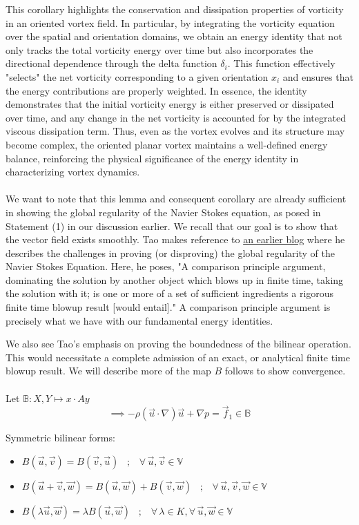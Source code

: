 \documentclass[12pt]{article}
\begin{document}
\begin{remark}
    This corollary highlights the conservation and dissipation properties of vorticity in an oriented vortex field. In particular, by integrating the vorticity equation over the spatial and orientation domains, we obtain an energy identity that not only tracks the total vorticity energy over time but also incorporates the directional dependence through the delta function \(\delta_i\). This function effectively "selects" the net vorticity corresponding to a given orientation \(x_i\) and ensures that the energy contributions are properly weighted. In essence, the identity demonstrates that the initial vorticity energy is either preserved or dissipated over time, and any change in the net vorticity is accounted for by the integrated viscous dissipation term. Thus, even as the vortex evolves and its structure may become complex, the oriented planar vortex maintains a well-defined energy balance, reinforcing the physical significance of the energy identity in characterizing vortex dynamics. \\ \\ 
    We want to note that this lemma and consequent corollary are already sufficient in showing the global regularity of the Navier Stokes equation, as posed in Statement (1) in our discussion earlier. We recall that our goal is to show that the vector field exists smoothly. Tao makes reference to \href{https://terrytao.wordpress.com/2007/03/18/why-global-regularity-for-navier-stokes-is-hard/}{an earlier blog} where he describes the challenges in proving (or disproving) the global regularity of the Navier Stokes Equation. Here, he poses, "A comparison principle argument, dominating the solution by another object which blows up in finite time, taking the solution with it; is one or more of a set of sufficient ingredients a rigorous finite time blowup result [would entail]." A comparison principle argument is precisely what we have with our fundamental energy identities. 
\end{remark} 

We also see Tao's emphasis on proving the boundedness of the bilinear operation. This would necessitate a complete admission of an exact, or analytical finite time blowup result. We will describe more of the map $B$ follows to show convergence. \\\\
 Let $\mathbb{B} : X,Y \mapsto x\cdot Ay$
\[\implies -\rho(\vec u \cdot \nabla) \vec u + \nabla p = \vec f_{1} \in \mathbb{B}\]

Symmetric bilinear forms: 
\begin{itemize}
    \item $B (\vec u, \vec v) = B (\vec v, \vec u) \;\;\;;\;\;\;\forall \, \vec u, \vec v \in \mathbb{V}$ 
    \item $B (\vec u + \vec v, \vec w) = B (\vec u, \vec w) + B (\vec v, \vec w) \;\;\;;\;\;\; \forall \, \vec u, \vec v, \vec w \in \mathbb{V} $ 
    \item $B (\lambda \vec u, \vec w) = \lambda B (\vec u, \vec w) \;\;\;;\;\;\; \forall \, \lambda \in K, \forall \, \vec u, \vec w \in \mathbb{V} $ \\ 
\end{itemize} 
\end{document}
